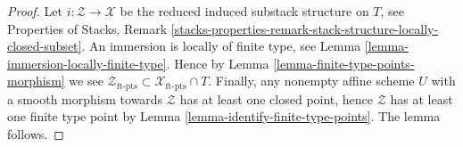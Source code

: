 \documentclass[10pt,a4paper]{amsart}
\theoremstyle{plain}
\theoremstyle{definition}
\theoremstyle{remark}
\numberwithin{equation}{subsection}
\begin{document}
\begin{proof}
Let $i : \mathcal{Z} \to \mathcal{X}$ be the reduced induced substack
structure on $T$, see
Properties of Stacks,
Remark \ref{stacks-properties-remark-stack-structure-locally-closed-subset}.
An immersion is locally of finite type, see
Lemma \ref{lemma-immersion-locally-finite-type}.
Hence by
Lemma \ref{lemma-finite-type-points-morphism}
we see
$\mathcal{Z}_{\text{ft-pts}} \subset \mathcal{X}_{\text{ft-pts}} \cap T$.
Finally, any nonempty affine scheme $U$ with a smooth morphism towards
$\mathcal{Z}$ has at least one closed point, hence $\mathcal{Z}$ has at least
one finite type point by
Lemma \ref{lemma-identify-finite-type-points}.
The lemma follows.
\end{proof}
\end{document}
